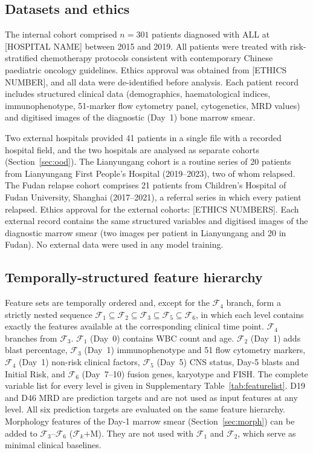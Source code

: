\documentclass[pdflatex,sn-nature]{sn-jnl}
\begin{document}
\subsection{Datasets and ethics}\label{sec:dataset}

The internal cohort comprised $n=301$ patients diagnosed with ALL at
[HOSPITAL NAME] between 2015 and 2019.
All patients were treated with risk-stratified chemotherapy protocols
consistent with contemporary Chinese paediatric oncology guidelines.
Ethics approval was obtained from [ETHICS NUMBER], and all data were
de-identified before analysis.
Each patient record includes structured clinical data (demographics,
haematological indices, immunophenotype, 51-marker flow cytometry
panel, cytogenetics, MRD values) and digitised images of the diagnostic
(Day~1) bone marrow smear.

Two external hospitals provided 41 patients in a single file with a
recorded hospital field, and the two hospitals are analysed as separate
cohorts (Section~\ref{sec:ood}).
The Lianyungang cohort is a routine series of 20 patients from
Lianyungang First People's Hospital (2019--2023), two of whom relapsed.
The Fudan relapse cohort comprises 21 patients from Children's Hospital
of Fudan University, Shanghai (2017--2021), a referral series in which
every patient relapsed.
Ethics approval for the external cohorts: [ETHICS NUMBERS].
Each external record contains the same structured variables and
digitised images of the diagnostic marrow smear (two images per
patient in Lianyungang and 20 in Fudan).
No external data were used in any model training.

\subsection{Temporally-structured feature hierarchy}\label{sec:features}

Feature sets are temporally ordered and, except for the
$\mathcal{F}_4$ branch, form a strictly nested sequence
$\mathcal{F}_1 \subseteq \mathcal{F}_2 \subseteq \mathcal{F}_3
\subseteq \mathcal{F}_5 \subseteq \mathcal{F}_6$, in which each level
contains exactly the features available at the corresponding clinical
time point.
$\mathcal{F}_4$ branches from $\mathcal{F}_3$.
$\mathcal{F}_1$ (Day~0) contains WBC count and age.
$\mathcal{F}_2$ (Day~1) adds blast percentage, $\mathcal{F}_3$
(Day~1) immunophenotype and 51 flow cytometry markers, $\mathcal{F}_4$
(Day~1) non-risk clinical factors, $\mathcal{F}_5$ (Day~5) CNS status,
Day-5 blasts and Initial Risk, and $\mathcal{F}_6$ (Day~7--10) fusion
genes, karyotype and FISH.
The complete variable list for every level is given in Supplementary
Table~\ref{tab:featurelist}.
D19 and D46 MRD are prediction targets and are not used as input
features at any level.
All six prediction targets are evaluated on the same feature hierarchy.
Morphology features of the Day-1 marrow smear
(Section~\ref{sec:morph}) can be added to
$\mathcal{F}_3$--$\mathcal{F}_6$ ($\mathcal{F}_k$$+$M).
They are not used with $\mathcal{F}_1$ and $\mathcal{F}_2$, which
serve as minimal clinical baselines.
\end{document}
